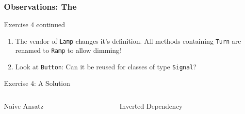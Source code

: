 \documentclass[9pt]{beamer}
\begin{document}
\begin{frame}
  \frametitle{Observations: The \secname}
\begin{exampleblock}{Exercise 4 continued}
  \begin{enumerate}
  \item The vendor of \texttt{Lamp} changes it's definition. All methods containing \texttt{Turn} are renamed to \texttt{Ramp} to allow dimming!
  \item Look at \texttt{Button}: Can it be reused for classes of type \texttt{Signal}?
  \end{enumerate}
\end{exampleblock}
\pause
\begin{exampleblock}{Exercise 4: A Solution}
  \begin{columns}[t]

    \begin{column}{.45\textwidth}
       \begin{block}{Naive Ansatz}

          \begin{center}
          \end{center}
       \end{block}
    \end{column}

    \begin{column}{.45\textwidth}
       \begin{block}{Inverted Dependency}
       \begin{center}
       \end{center}
      \end{block}
    \end{column}


\end{columns}
\end{exampleblock}
\end{frame}
\end{document}
